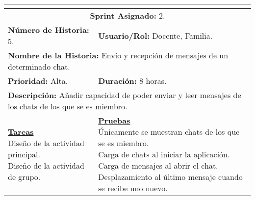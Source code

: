 \resizebox{15cm}{!} {
	\begin{tabular}{|l|l|}
		\hline
		\multicolumn{2}{|c|}{\cellcolor[HTML]{343434}{\color[HTML]{FFFFFF} \textbf{Historia de Usuario}}} \\
		\hline
		\multicolumn{2}{|c|}{\textbf{Sprint Asignado:} 2.} \\
		\hline
		\textbf{Número de Historia:} 5. & \textbf{Usuario/Rol:} Docente, Familia.\\
		\hline
		\multicolumn{2}{|l|}{\textbf{Nombre de la Historia:} Envío y recepción de mensajes de un determinado chat.} \\
		\hline
		\textbf{Prioridad:} Alta. & \textbf{Duración:} 8 horas.\\
		\hline
		\multicolumn{2}{|l|}{\textbf{Descripción:} Añadir capacidad de poder enviar y leer mensajes de los chats de los que se es miembro.} \\
		\hline
		\specialcell{\underline{\textbf{Tareas}} \\ Diseño de la actividad principal. \\ Diseño de la actividad de grupo.} & \specialcell{\underline{\textbf{Pruebas}} \\ Únicamente se muestran chats de los que se es miembro. \\ Carga de chats al iniciar la aplicación. \\ Carga de mensajes al abrir el chat. \\ Desplazamiento al último mensaje cuando se recibe uno nuevo.} \\
		\hline
	\end{tabular}
}

